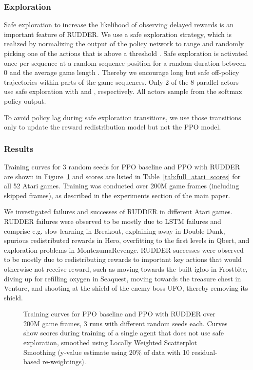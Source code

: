 \documentclass{article}
\newcommand{\figpath}{figures/}
\begin{document}
\begin{appendices}
\subsubsection{Exploration}
\label{sec:Aatari-exploration}
Safe exploration to increase the likelihood of observing 
delayed rewards is an important feature of RUDDER.
We use a safe exploration strategy, which is realized by normalizing the output 
of the policy network to range  and randomly picking one of the actions 
that is above a threshold . 
Safe exploration is activated once per sequence at a random sequence position 
for a random duration between 0 and the average game length . 
Thereby we encourage long but safe off-policy trajectories within parts of the game sequences.
Only 2 of the 8 parallel actors use safe exploration with  and , respectively.
All actors sample from the softmax policy output.

To avoid policy lag during safe exploration transitions,
we use those transitions only to update
the reward redistribution model but not the PPO model.


\subsubsection{Results}
Training curves for 3 random seeds for PPO baseline and PPO with RUDDER are shown in Figure~\ref{fig:atari_training} and scores are listed in Table~\ref{tab:full_atari_scores} for all 52 Atari games. Training was conducted over 200M game frames (including skipped frames), as described in the experiments section of the main paper. 

We investigated failures and successes of RUDDER in different Atari games.
RUDDER failures were observed to be mostly due to LSTM failures and comprise e.g. slow learning in Breakout, explaining away in Double Dunk, spurious redistributed rewards in Hero, overfitting to the first levels in Qbert, and exploration problems in MontezumaRevenge.
RUDDER successes were observed to be mostly due to redistributing rewards to important key actions that would otherwise not receive reward, such as moving towards the built igloo in Frostbite, diving up for refilling oxygen in Seaquest, moving towards the treasure chest in Venture, and shooting at the shield of the enemy boss UFO, thereby removing its shield.

\begin{figure}[htp]\centering \resizebox{\textwidth}{!}{}\caption{Training curves for PPO baseline and PPO with RUDDER over 200M game frames, 3 runs with different random seeds each. Curves show scores during training of a single agent that does not use safe exploration, smoothed using Locally Weighted Scatterplot Smoothing (y-value estimate using 20\% of data with 10 residual-based re-weightings).\label{fig:atari_training}}\end{figure}





\end{appendices}
\end{document}
